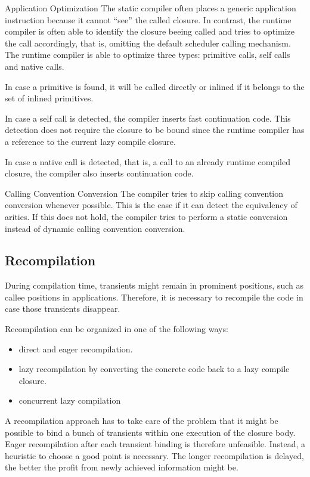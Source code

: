 \begin{paragraph}{Application Optimization}
The static compiler often places a generic application instruction because
it cannot ``see'' the called closure.
In contrast, the runtime compiler is often able to identify the closure beeing
called and tries to optimize the call accordingly, that is, omitting
the default scheduler calling mechanism. The runtime compiler is able to
optimize three types: primitive calls, self calls and native calls.

In case a primitive is found, it will be called directly or inlined if it
belongs to the set of inlined primitives.

In case a self call is detected, the compiler inserts fast continuation code.
This detection does not require the closure to be bound since the runtime
compiler has a reference to the current lazy compile closure.

In case a native call is detected, that is, a call to an already runtime
compiled closure, the compiler also inserts continuation code.
\end{paragraph}
\begin{paragraph}{Calling Convention Conversion}
The compiler tries to skip
calling convention conversion whenever possible. This is the case if it
can detect the equivalency of arities.
If this does not hold, the compiler tries to perform a static
conversion instead of dynamic calling convention conversion.
\end{paragraph}
\subsection{Recompilation}
During compilation time, transients might remain in prominent positions,
such as callee positions in applications.
Therefore, it is necessary to recompile
the code in case those transients disappear.

Recompilation can be organized in one of the following ways:
\begin{itemize}
\item direct and eager recompilation.
\item lazy recompilation by converting the concrete code back to a lazy
compile closure.
\item concurrent lazy compilation
\end{itemize}
A recompilation approach has
to take care of the problem that it might be possible to bind a bunch
of transients within one execution of the closure body.
Eager recompilation after each transient binding
is therefore unfeasible. Instead, a heuristic to choose a good point
is necessary. The longer recompilation is delayed, the better the
profit from newly achieved information might be.

